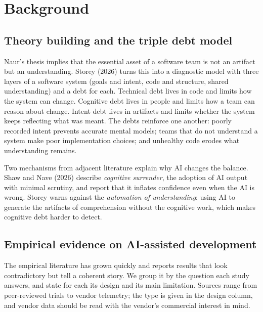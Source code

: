 \documentclass[11pt]{article}
\begin{document}
\section{Background}

\subsection{Theory building and the triple debt model}

Naur's thesis implies that the essential asset of a software team is not an artifact but an understanding. Storey (2026) turns this into a diagnostic model with three layers of a software system (goals and intent, code and structure, shared understanding) and a debt for each. Technical debt lives in code and limits how the system can change. Cognitive debt lives in people and limits how a team can reason about change. Intent debt lives in artifacts and limits whether the system keeps reflecting what was meant. The debts reinforce one another: poorly recorded intent prevents accurate mental models; teams that do not understand a system make poor implementation choices; and unhealthy code erodes what understanding remains.

Two mechanisms from adjacent literature explain why AI changes the balance. Shaw and Nave (2026) describe \emph{cognitive surrender}, the adoption of AI output with minimal scrutiny, and report that it inflates confidence even when the AI is wrong. Storey warns against the \emph{automation of understanding}: using AI to generate the artifacts of comprehension without the cognitive work, which makes cognitive debt harder to detect.

\subsection{Empirical evidence on AI-assisted development}

The empirical literature has grown quickly and reports results that look contradictory but tell a coherent story. We group it by the question each study answers, and state for each its design and its main limitation. Sources range from peer-reviewed trials to vendor telemetry; the type is given in the design column, and vendor data should be read with the vendor's commercial interest in mind.
\end{document}
